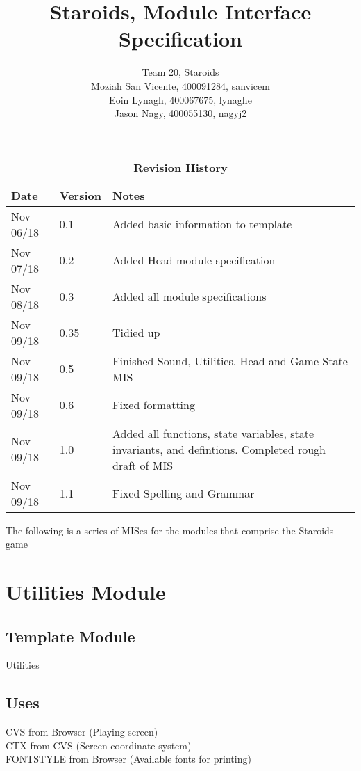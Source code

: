 \documentclass[12pt]{article}
\title{Staroids, Module Interface Specification}
\author{Team 20, Staroids
  \\ Moziah San Vicente, 400091284, sanvicem
  \\ Eoin Lynagh, 400067675, lynaghe
  \\ Jason Nagy, 400055130, nagyj2
}
\begin{document}
\maketitle

\begin{table}[bp]
\caption{\bf Revision History}
\begin{tabularx}{\textwidth}{p{3cm}p{2cm}X}
\toprule {\bf Date} & {\bf Version} & {\bf Notes}\\
\midrule
Nov 06/18 & 0.1 & Added basic information to template\\
Nov 07/18 & 0.2 & Added Head module specification\\
Nov 08/18 & 0.3 & Added all module specifications\\
Nov 09/18 & 0.35 & Tidied up\\
Nov 09/18 & 0.5 & Finished Sound, Utilities, Head and Game State MIS\\
Nov 09/18 & 0.6 & Fixed formatting\\
Nov 09/18 & 1.0 & Added all functions, state variables, state invariants, and defintions. Completed rough draft of MIS\\
Nov 09/18 & 1.1 & Fixed Spelling and Grammar\\
\bottomrule
\end{tabularx}
\end{table}

The following is a series of MISes for the modules that comprise the Staroids game

\newpage

\section*{Utilities Module}

\subsection*{Template Module}

Utilities

\subsection*{Uses}

CVS from Browser (Playing screen)\\
CTX from CVS (Screen coordinate system)\\
FONTSTYLE from Browser (Available fonts for printing)\\
\end{document}
